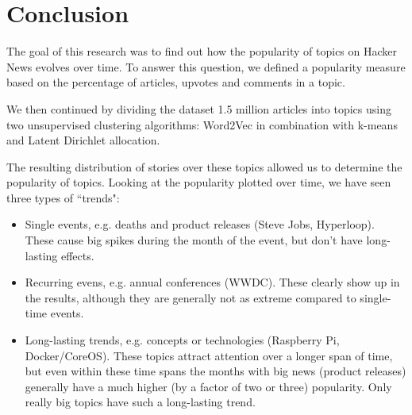 \section{Conclusion}
The goal of this research was to find out how the popularity of topics on Hacker News evolves over time. To answer this question, we defined a popularity measure based on the percentage of articles, upvotes and comments in a topic.

We then continued by dividing the dataset 1.5 million articles into topics using two unsupervised clustering algorithms: Word2Vec in combination with k-means and Latent Dirichlet allocation.

The resulting distribution of stories over these topics allowed us to determine the popularity of topics. Looking at the popularity plotted over time, we have seen three types of ``trends":
\begin{itemize}
\item Single events, e.g. deaths and product releases (Steve Jobs, Hyperloop). These cause big spikes during the month of the event, but don't have long-lasting effects.
\item Recurring evens, e.g. annual conferences (WWDC). These clearly show up in the results, although they are generally not as extreme compared to single-time events.
\item Long-lasting trends, e.g. concepts or technologies (Raspberry Pi, Docker/CoreOS). These topics attract attention over a longer span of time, but even within these time spans the months with big news (product releases) generally have a much higher (by a factor of two or three) popularity. Only really big topics have such a long-lasting trend.
\end{itemize}

